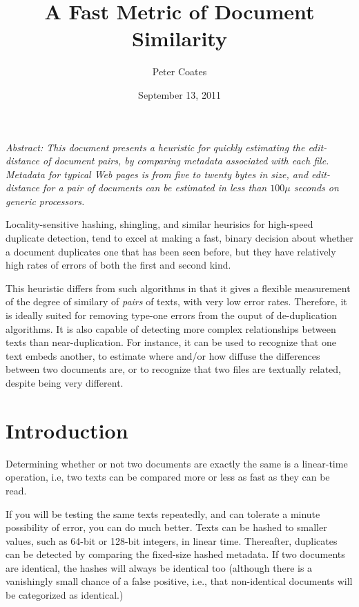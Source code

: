 \documentclass[html]{article}    %
\title{A Fast Metric of Document Similarity}  %
\author{Peter Coates}    %
\date{September 13, 2011}   %
\begin{document}

\maketitle                 %

{ \em \noindent Abstract: 
This document presents a heuristic for quickly estimating the 
edit-distance of document pairs, by comparing metadata associated with each
file.
Metadata for typical Web pages is from five to twenty bytes in size, 
and edit-distance for a pair of documents can be estimated in less 
than $100\mu$ seconds on generic processors.

Locality-sensitive hashing, shingling, and similar heurisics for
high-speed duplicate detection, tend to excel at making a fast, binary decision
about whether a document duplicates one that has been seen before, but
they have relatively high rates of errors of both the first and second kind. 

This heuristic differs from such algorithms in that it gives a flexible
measurement of the degree of similary of {\em pairs} of texts, with very low
error rates. 
Therefore, it is ideally suited for removing type-one errors from the ouput of
de-duplication algorithms.
It is also capable of detecting more complex relationships between texts
than near-duplication.
For instance, it can be used to recognize that one text embeds another,
to estimate where and/or how diffuse the differences between two documents are, 
or to recognize that two files are textually related, despite being very different.
}

%
%
\section{Introduction}

Determining whether or not two documents are exactly the same is a linear-time
operation, i.e, two texts can be compared more or less as fast as they 
can be read. 

If you will be testing the same texts repeatedly, and can tolerate a minute
possibility of error, you can do much better.
Texts can be hashed to smaller values, such as 64-bit or 128-bit integers, 
in linear time. 
Thereafter, duplicates can be detected by comparing the fixed-size hashed
metadata. 
If two documents are identical, the hashes will always be identical too 
(although there is a vanishingly small chance of a false positive, i.e., that
non-identical documents will be categorized as identical.)
\end{document}
